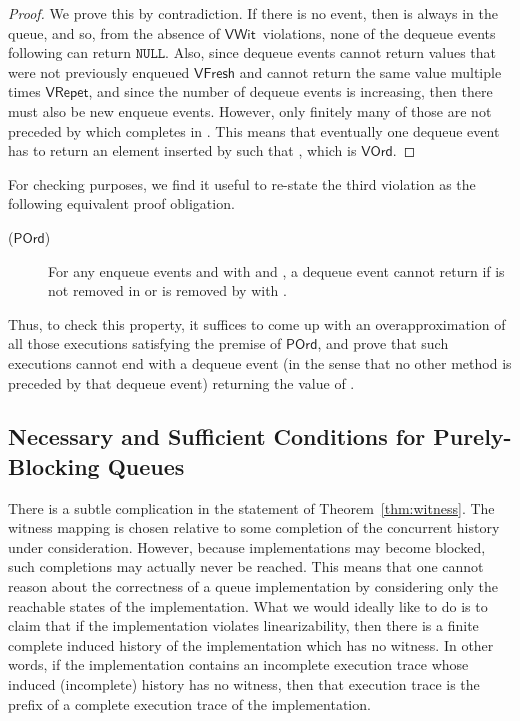 \documentclass{LMCS}
\newcommand{\NULL}{\ensuremath{\mathtt{NULL}}}
\newcommand{\VFresh}{\ensuremath{\mathsf{VFresh}}}
\newcommand{\VRepet}{\ensuremath{\mathsf{VRepet}}}
\newcommand{\VOrd}{\ensuremath{\mathsf{VOrd}}}
\newcommand{\VWit}{\ensuremath{\mathsf{VWit}}}
\newcommand{\POrd}{\ensuremath{\mathsf{POrd}}}
\begin{document}
\begin{proof}
We prove this by contradiction. 
If there is no  event, then  is always in the queue, 
and so, from the absence of \VWit\ violations, none of the dequeue events
following  can return \NULL.
Also, since dequeue events cannot return values that were not previously
enqueued {\VFresh} and cannot return the same value multiple times {\VRepet},
and since the number of dequeue events is increasing, then there must also be
new enqueue events.
However, only finitely many of those are not preceded by  which
completes in . 
This means that eventually one dequeue event has to return an element inserted
by  such that , which is \VOrd.
\end{proof}

For checking purposes, we find it useful to re-state the third violation as the following
equivalent proof obligation.
\begin{description}
\item[(\POrd)]
For any enqueue events  and  with  and \mbox{},
a dequeue event  cannot return  
if  is not removed in  or is removed by  with .
\end{description}
Thus, to check this property, it suffices to come up with an overapproximation of
all those executions satisfying the premise of \POrd, and prove that such executions
cannot end with a dequeue event (in the sense that no other method is preceded 
by that dequeue event) returning the value of .

\subsection*{Necessary and Sufficient Conditions for Purely-Blocking Queues}

There is a subtle complication in the statement of Theorem~\ref{thm:witness}.
The witness mapping is chosen relative to some completion of the concurrent history under
consideration. 
However, because implementations may become blocked, such completions may actually never be reached. 
This means that one cannot reason about the correctness of a queue implementation by considering only the reachable states of the implementation.
What we would ideally like to do is to claim that if the implementation violates linearizability, then there is a finite complete induced history of the implementation which has no witness. 
In other words, if the implementation contains an incomplete execution trace whose induced (incomplete) history has no witness, then that execution trace is the prefix of a complete execution trace of the implementation.
\end{document}

